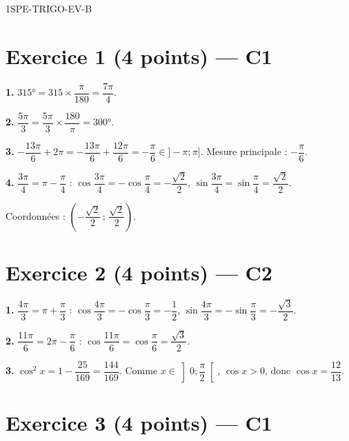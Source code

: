 \begin{corrige}{1SPE-TRIGO-EV-B}

\section*{Exercice 1 \hfill (4 points) — C1}


\textbf{1.} $315° = 315 \times \dfrac{\pi}{180} = \dfrac{7\pi}{4}$.

\textbf{2.} $\dfrac{5\pi}{3} = \dfrac{5\pi}{3} \times \dfrac{180}{\pi} = 300°$.

\textbf{3.} $-\dfrac{13\pi}{6} + 2\pi = -\dfrac{13\pi}{6} + \dfrac{12\pi}{6} = -\dfrac{\pi}{6} \in {]-\pi;\pi]}$. Mesure principale : $-\dfrac{\pi}{6}$.

\textbf{4.} $\dfrac{3\pi}{4} = \pi - \dfrac{\pi}{4}$ : $\cos\dfrac{3\pi}{4} = -\cos\dfrac{\pi}{4} = -\dfrac{\sqrt{2}}{2}$, $\sin\dfrac{3\pi}{4} = \sin\dfrac{\pi}{4} = \dfrac{\sqrt{2}}{2}$.

Coordonnées : $\left(-\dfrac{\sqrt{2}}{2}\,;\,\dfrac{\sqrt{2}}{2}\right)$.

\section*{Exercice 2 \hfill (4 points) — C2}


\textbf{1.} $\dfrac{4\pi}{3} = \pi + \dfrac{\pi}{3}$ :
$\cos\dfrac{4\pi}{3} = -\cos\dfrac{\pi}{3} = -\dfrac{1}{2}$, \quad $\sin\dfrac{4\pi}{3} = -\sin\dfrac{\pi}{3} = -\dfrac{\sqrt{3}}{2}$.

\textbf{2.} $\dfrac{11\pi}{6} = 2\pi - \dfrac{\pi}{6}$ :
$\cos\dfrac{11\pi}{6} = \cos\dfrac{\pi}{6} = \dfrac{\sqrt{3}}{2}$.

\textbf{3.} $\cos^2 x = 1 - \dfrac{25}{169} = \dfrac{144}{169}$. Comme $x \in \left]0;\dfrac{\pi}{2}\right[$, $\cos x > 0$, donc $\cos x = \dfrac{12}{13}$.

\section*{Exercice 3 \hfill (4 points) — C1}


\end{corrige}
